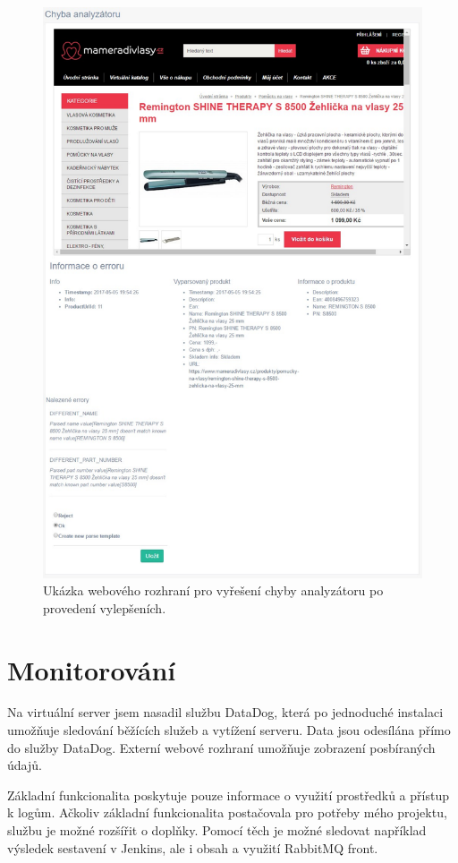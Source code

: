 \documentclass[thesis=B,czech]{FITthesis}[2012/06/26]
\begin{document}
\begin{figure}\centering
 	\includegraphics[width=1.0\textwidth]{resources/analyser-err}
	\caption[Webové rozhraní pro vyřešení chyby analyzátoru po provedení vylepšeních]{Ukázka webového rozhraní pro vyřešení chyby analyzátoru po provedení vylepšeních.}\label{fig:analyser-error}
\end{figure}

\section{Monitorování}
Na virtuální server jsem nasadil službu DataDog\cite{dataDog}, která po jednoduché instalaci umožňuje sledování běžících služeb
a vytížení serveru. Data jsou odesílána přímo do služby DataDog. Externí webové rozhraní umožňuje zobrazení posbíraných údajů.
\par
Základní funkcionalita poskytuje pouze informace o využití prostředků a přístup k logům. Ačkoliv základní funkcionalita postačovala pro potřeby 
mého projektu, službu je možné rozšířit o doplňky. Pomocí těch je možné sledovat například výsledek sestavení v Jenkins, ale i obsah a využití RabbitMQ front. 
\end{document}
